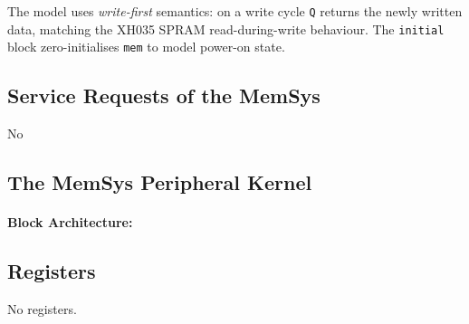 The model uses \emph{write-first} semantics: on a write cycle
\texttt{Q} returns the newly written data, matching the XH035 SPRAM
read-during-write behaviour.
The \texttt{initial} block zero-initialises \texttt{mem} to
model power-on state.






\subsection{Service Requests of the MemSys}
No


\subsection{The MemSys Peripheral Kernel}
\label{subsec:memsysfunc02}
\paragraph{Block Architecture: } 



\subsection{Registers}
No registers.

